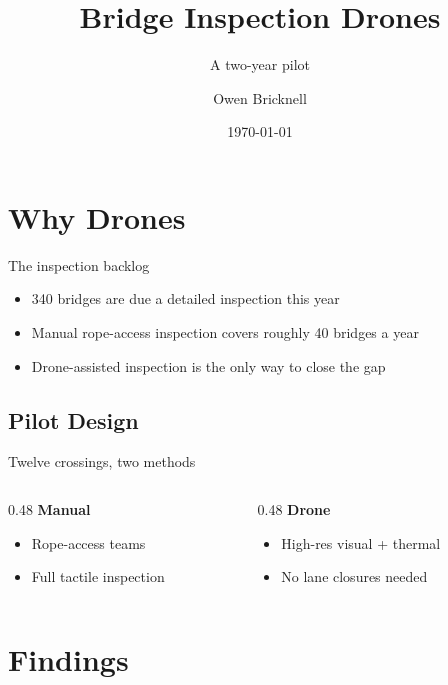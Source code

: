 \documentclass[xcolor={rgb}]{beamer}
\title{Bridge Inspection Drones}
\subtitle{A two-year pilot}
\author{Owen Bricknell}
\institute{Department of Transport Infrastructure}
\date{\today}
\begin{document}
\begin{frame}[plain]
  \titlepage
\end{frame}

\section{Why Drones}

\begin{frame}{The inspection backlog}
  \begin{itemize}
    \item 340 bridges are due a detailed inspection this year
    \item Manual rope-access inspection covers roughly 40 bridges a year
    \item Drone-assisted inspection is the only way to close the gap
  \end{itemize}
\end{frame}

\subsection{Pilot Design}

\begin{frame}{Twelve crossings, two methods}
  \begin{columns}[T]
    \begin{column}{0.48\textwidth}
      \textbf{Manual}
      \begin{itemize}
        \item Rope-access teams
        \item Full tactile inspection
      \end{itemize}
    \end{column}
    \begin{column}{0.48\textwidth}
      \textbf{Drone}
      \begin{itemize}
        \item High-res visual + thermal
        \item No lane closures needed
      \end{itemize}
    \end{column}
  \end{columns}
\end{frame}

\section{Findings}
\end{document}
